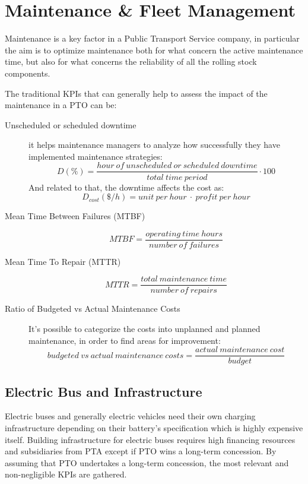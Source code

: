 \newpage
\section{Maintenance \& Fleet Management}
Maintenance is a key factor in a Public Transport Service company, in particular the aim is to optimize maintenance both for what concern the active maintenance time, but also  for what concerns the reliability of all the rolling stock components.

The traditional KPIs that can generally help to assess the impact of the maintenance in a PTO can be:

\begin{description}
    \item [Unscheduled or scheduled downtime] it helps maintenance managers to analyze how successfully they have implemented maintenance strategies:
        \begin{equation}
            D (\%)= \frac{hour\:of\: unscheduled\:or\:scheduled\:downtime}{total\:time\:period}\cdot 100
        \end{equation}
        And related to that, the downtime affects the cost as:
        \begin{equation}
        D_{cost} (\$/h)= unit\: per\: hour\: \cdot\: profit\: per\: hour
        \end{equation}
    \item [Mean Time Between Failures (MTBF)]
        \begin{equation}
            MTBF = \frac{operating\:time\:hours}{number\:of\:failures}
        \end{equation}
    \item [Mean Time To Repair (MTTR)]
        \begin{equation}
            MTTR = \frac{total\:maintenance\:time}{number\:of\:repairs}
        \end{equation}
    \item [Ratio of Budgeted vs Actual Maintenance Costs] It's possible to categorize the costs into unplanned and planned maintenance, in order to find areas for improvement:
        \begin{equation}
            budgeted\:vs\:actual\:maintenance\:costs = \frac{actual\:maintenance\:cost}{budget}
        \end{equation}    
\end{description}


\subsection{Electric Bus and Infrastructure}
\label{sec:elbusinfra}
Electric buses and generally electric vehicles need their own charging infrastructure depending on their battery’s specification which is highly expensive itself. Building infrastructure for electric buses requires high financing resources and subsidiaries from PTA except if PTO wins a long-term concession. By assuming that PTO undertakes a long-term concession, the most relevant and non-negligible KPIs are gathered.

